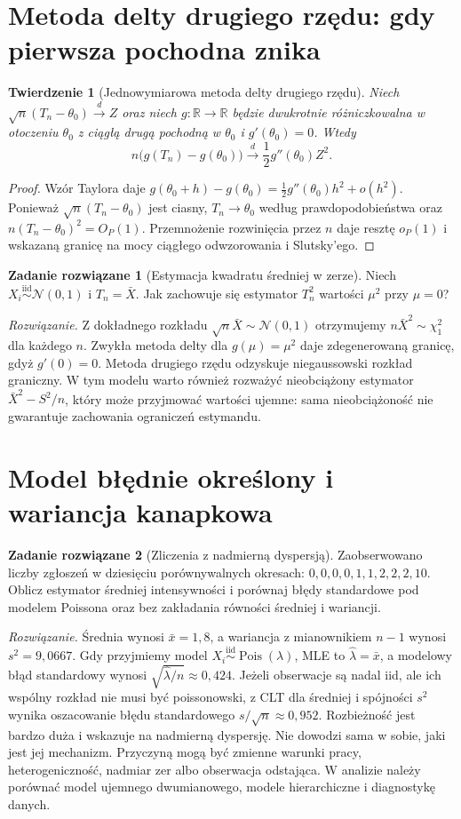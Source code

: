 \documentclass[11pt,a4paper,oneside]{report}
\numberwithin{equation}{chapter}
\theoremstyle{plain}
\newtheorem{twierdzenie}{Twierdzenie}[chapter]
\theoremstyle{definition}
\newtheorem{zadanie}{Zadanie rozwiązane}[chapter]
\theoremstyle{remark}
\newcommand{\R}{\mathbb R}
\newcommand{\Normal}{\mathcal N}
\newcommand{\iid}{\mathrel{\overset{\mathrm{iid}}\sim}}
\DeclareMathOperator{\Pois}{Pois}
\begin{document}
\section{Metoda delty drugiego rzędu: gdy pierwsza pochodna znika}
\begin{twierdzenie}[Jednowymiarowa metoda delty drugiego rzędu]
\label{thm:delta-second}
Niech $\sqrt n(T_n-\theta_0)\xrightarrow{d}Z$ oraz niech
$g:\R\to\R$ będzie dwukrotnie różniczkowalna w otoczeniu
$\theta_0$ z ciągłą drugą pochodną w $\theta_0$ i
$g'(\theta_0)=0$. Wtedy
\[
n\bigl(g(T_n)-g(\theta_0)\bigr)
\xrightarrow{d}\frac12g''(\theta_0)Z^2.
\]
\end{twierdzenie}
\begin{proof}
Wzór Taylora daje
$g(\theta_0+h)-g(\theta_0)=\frac12g''(\theta_0)h^2+
o(h^2)$. Ponieważ $\sqrt n(T_n-\theta_0)$ jest ciasny,
$T_n\to\theta_0$ według prawdopodobieństwa oraz
$n(T_n-\theta_0)^2=O_P(1)$. Przemnożenie rozwinięcia
przez $n$ daje resztę $o_P(1)$ i wskazaną granicę na mocy
ciągłego odwzorowania i Slutsky'ego.
\end{proof}
\begin{zadanie}[Estymacja kwadratu średniej w zerze]
Niech $X_i\iid\Normal(0,1)$ i $T_n=\bar X$. Jak zachowuje
się estymator $T_n^2$ wartości $\mu^2$ przy $\mu=0$?
\par\emph{Rozwiązanie.} Z dokładnego rozkładu
$\sqrt n\bar X\sim\Normal(0,1)$ otrzymujemy
$n\bar X^2\sim\chi_1^2$ dla każdego $n$.
Zwykła metoda delty dla $g(\mu)=\mu^2$ daje zdegenerowaną
granicę, gdyż $g'(0)=0$. Metoda drugiego rzędu odzyskuje
niegaussowski rozkład graniczny. W tym modelu warto również
rozważyć nieobciążony estymator $\bar X^2-S^2/n$,
który może przyjmować wartości ujemne: sama nieobciążoność
nie gwarantuje zachowania ograniczeń estymandu.
\end{zadanie}

\section{Model błędnie określony i wariancja kanapkowa}
\begin{zadanie}[Zliczenia z nadmierną dyspersją]
Zaobserwowano liczby zgłoszeń w dziesięciu porównywalnych
okresach: $0,0,0,0,1,1,2,2,2,10$. Oblicz estymator średniej
intensywności i porównaj błędy standardowe pod modelem Poissona
oraz bez zakładania równości średniej i wariancji.
\par\emph{Rozwiązanie.} Średnia wynosi $\bar x=1{,}8$,
a wariancja z mianownikiem $n-1$ wynosi
$s^2=9{,}0667$. Gdy przyjmiemy model
$X_i\iid\Pois(\lambda)$, MLE to $\widehat\lambda=\bar x$,
a modelowy błąd standardowy wynosi
$\sqrt{\widehat\lambda/n}\approx0{,}424$.
Jeżeli obserwacje są nadal iid, ale ich wspólny rozkład nie
musi być poissonowski, z CLT dla średniej i spójności
$s^2$ wynika oszacowanie błędu standardowego
$s/\sqrt n\approx0{,}952$.
Rozbieżność jest bardzo duża i wskazuje na nadmierną dyspersję.
Nie dowodzi sama w sobie, jaki jest jej mechanizm. Przyczyną
mogą być zmienne warunki pracy, heterogeniczność, nadmiar zer
albo obserwacja odstająca. W analizie należy porównać model
ujemnego dwumianowego, modele hierarchiczne i diagnostykę danych.
\end{zadanie}
\end{document}
